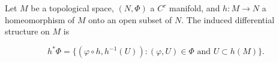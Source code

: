 Let $M$ be a topological space, $(N, \Phi)$ a $C^r$ manifold, and $h: M \to N$ a homeomorphism of $M$ onto an open subset of $N$. The induced differential structure on $M$ is

$$h^*\Phi = \{(\varphi \circ h, h^{-1}(U)) : (\varphi, U) \in \Phi \text{ and } U \subset h(M)\}.$$

